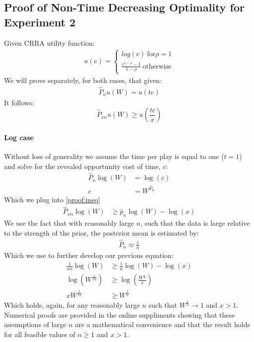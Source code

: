\documentclass[a4paper,12pt]{article}
\begin{document}
\begin{appendices}
\newpage

\section{Proof of Non-Time Decreasing Optimality for Experiment 2}
\label{appendix:proof}

Given CRRA utility function:
\begin{align*}
u(c) =
  \begin{cases}
    log(c) \ \text{for} \rho = 1 \\
    \frac{c^{1 - \rho} - 1}{1 - \rho} \ \text{otherwise}
  \end{cases}
\end{align*}
%
We will prove separately, for both cases, that given:
\begin{align*}
  \hat{P}_{n}u(W) = u(tc)
\end{align*}
It follows:
\begin{equation} \label{proof:ineq}
  \hat{P}_{xn}u(W) \geq u(\frac{tc}{x})
\end{equation}
%
\paragraph{Log case}

Without loss of generality we assume the time per play is equal to one ($t = 1$) and solve for the revealed opportunity cost of time, $c$:
%
\begin{align*}
  \hat{P}_{n} \log(W) &= \log(c) \\
  c &= W^{\hat{P}_n}
\end{align*}
%
Which we plug into \ref{proof:ineq}
\begin{align*}
  \hat{P}_{xn} \log(W) &\geq \hat{p}_n \log(W) - \log(x)
\end{align*}
We use the fact that with reasonably large $n$, such that the data is large relative to the strength of the prior, the posterior mean is estimated by:
\begin{align*}
  \hat{P}_n \approx \frac{1}{n}
\end{align*}
Which we use to further develop our previous equation:
\begin{align*}
  \frac{1}{xn} \log(W) &\geq \frac{1}{n} \log(W) - \log(x) \\
 \log \left( W^{\frac{1}{xn}} \right) &\geq \log \left( \frac{W^{\frac{1}{n}}}{x} \right) \\
  x W^{\frac{1}{xn}} &\geq W^{\frac{1}{n}}
\end{align*}
Which holds, again, for any reasonably large $n$ such that $W^{\frac{1}{n}} \rightarrow 1$ and $x > 1$. Numerical proofs are provided in the online suppliments showing that these assumptions of large $n$ are a mathematical convenience and that the result holds for all feasible values of $n \geq 1$ and $x > 1$.


\end{appendices}
\end{document}
